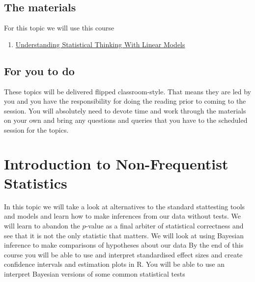 \documentclass[
]{book}
\providecommand{\tightlist}{%
  \setlength{\itemsep}{0pt}\setlength{\parskip}{0pt}}
\begin{document}
\hypertarget{the-materials-2}{%
\section{The materials}\label{the-materials-2}}

For this topic we will use this course

\begin{enumerate}
\def\labelenumi{\arabic{enumi}.}
\tightlist
\item
  \href{https://danmaclean.github.io/intro_to_stats/}{Understanding Statistical Thinking With Linear Models}
\end{enumerate}

\hypertarget{for-you-to-do-2}{%
\section{For you to do}\label{for-you-to-do-2}}

These topics will be delivered flipped classroom-style. That means they are led by you and you have the responsibility for doing the reading prior to coming to the session. You will absolutely need to devote time and work through the materials on your own and bring any questions and queries that you have to the scheduled session for the topics.

\hypertarget{introduction-to-non-frequentist-statistics}{%
\chapter{Introduction to Non-Frequentist Statistics}\label{introduction-to-non-frequentist-statistics}}

In this topic we will take a look at alternatives to the standard stattesting tools and models and learn how to make inferences from our data without tests. We will learn to abandon the \(p\)-value as a final arbiter of statistical correctness and see that it is not the only statistic that matters. We will look at using Bayesian inference to make comparisons of hypotheses about our data By the end of this course you will be able to use and interpret standardised effect sizes and create confidence intervals and estimation plots in R. You will be able to use an interpret Bayesian versions of some common statistical tests
\end{document}
